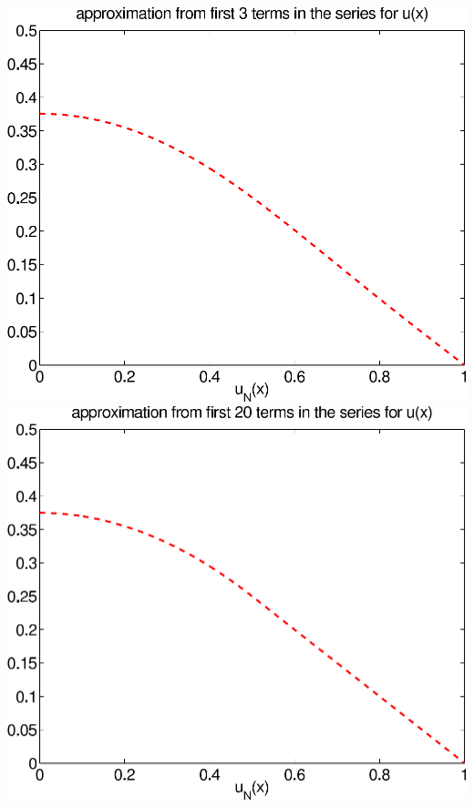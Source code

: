 {\begin{solution}
\begin{enumerate}
\begin{center}
   \includegraphics[scale=0.4]{bvps3_3a}\quad
   \includegraphics[scale=0.4]{bvps3_20a}
\end{center}


\end{enumerate}
\end{solution}}{}

